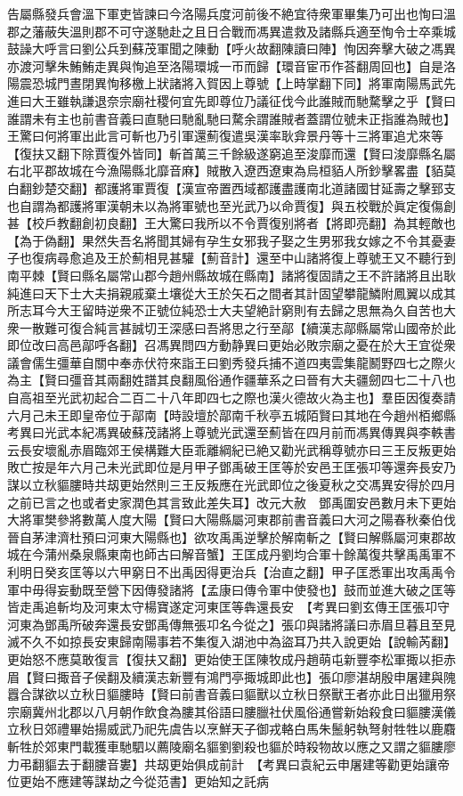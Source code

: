 告屬縣發兵會溫下軍吏皆諫曰今洛陽兵度河前後不絶宜待衆軍畢集乃可出也恂曰溫郡之藩蔽失溫則郡不可守遂馳赴之且日合戰而馮異遣救及諸縣兵適至恂令士卒乘城鼓譟大呼言曰劉公兵到蘇茂軍聞之陳動【呼火故翻陳讀曰陣】恂因奔擊大破之馮異亦渡河擊朱鮪鮪走異與恂追至洛陽環城一帀而歸【環音宦帀作荅翻周回也】自是洛陽震恐城門晝閉異恂移檄上狀諸將入賀因上尊號【上時掌翻下同】將軍南陽馬武先進曰大王雖執謙退奈宗廟社稷何宜先即尊位乃議征伐今此誰賊而馳騖擊之乎【賢曰誰謂未有主也前書音義曰直馳曰馳亂馳曰騖余謂誰賊者蓋謂位號未正指誰為賊也】王驚曰何將軍出此言可斬也乃引軍還薊復遣吳漢率耿弇景丹等十三將軍追尤來等【復扶又翻下除賈復外皆同】斬首萬三千餘級遂窮追至浚靡而還【賢曰浚靡縣名屬右北平郡故城在今漁陽縣北靡音麻】賊散入遼西遼東為烏桓貊人所鈔擊畧盡【貊莫白翻鈔楚交翻】都護將軍賈復【漢宣帝置西域都護盡護南北道諸國甘延壽之擊郅支也自謂為都護將軍漢朝未以為將軍號也至光武乃以命賈復】與五校戰於眞定復傷創甚【校戶教翻創初良翻】王大驚曰我所以不令賈復别將者【將即亮翻】為其輕敵也【為于偽翻】果然失吾名將聞其婦有孕生女邪我子娶之生男邪我女嫁之不令其憂妻子也復病尋愈追及王於薊相見甚驩【薊音計】還至中山諸將復上尊號王又不聽行到南平棘【賢曰縣名屬常山郡今趙州縣故城在縣南】諸將復固請之王不許諸將且出耿純進曰天下士大夫捐親戚棄土壤從大王於矢石之間者其計固望攀龍鱗附鳳翼以成其所志耳今大王留時逆衆不正號位純恐士大夫望絶計窮則有去歸之思無為久自苦也大衆一散難可復合純言甚誠切王深感曰吾將思之行至鄗【續漢志鄗縣屬常山國帝於此即位改曰高邑鄗呼各翻】召馮異問四方動静異曰更始必敗宗廟之憂在於大王宜從衆議會儒生彊華自關中奉赤伏符來詣王曰劉秀發兵捕不道四夷雲集龍鬭野四七之際火為主【賢曰彊音其兩翻姓譜其良翻風俗通作疆華系之曰晉有大夫疆劒四七二十八也自高祖至光武初起合二百二十八年即四七之際也漢火德故火為主也】羣臣因復奏請六月己未王即皇帝位于鄗南【時設壇於鄗南千秋亭五城陌賢曰其地在今趙州栢鄉縣　考異曰光武本紀馮異破蘇茂諸將上尊號光武還至薊皆在四月前而馮異傳異與李軼書云長安壞亂赤眉臨郊王侯構難大臣乖離綱紀已絶又勸光武稱尊號亦曰三王反叛更始敗亡按是年六月己未光武即位是月甲子鄧禹破王匡等於安邑王匡張卭等還奔長安乃謀以立秋貙膢時共刼更始然則三王反叛應在光武即位之後夏秋之交馮異安得於四月之前已言之也或者史家潤色其言致此差失耳】改元大赦　鄧禹圍安邑數月未下更始大將軍樊參將數萬人度大陽【賢曰大陽縣屬河東郡前書音義曰大河之陽春秋秦伯伐晉自茅津濟杜預曰河東大陽縣也】欲攻禹禹逆擊於解南斬之【賢曰解縣屬河東郡故城在今蒲州桑泉縣東南也師古曰解音蟹】王匡成丹劉均合軍十餘萬復共擊禹禹軍不利明日癸亥匡等以六甲窮日不出禹因得更治兵【治直之翻】甲子匡悉軍出攻禹禹令軍中毋得妄動既至營下因傳發諸將【孟康曰傳令軍中使發也】鼓而並進大破之匡等皆走禹追斬均及河東太守楊寶遂定河東匡等犇還長安　【考異曰劉玄傳王匡張卭守河東為鄧禹所破奔還長安鄧禹傳無張卭名今從之】張卬與諸將議曰赤眉旦暮且至見滅不久不如掠長安東歸南陽事若不集復入湖池中為盜耳乃共入說更始【說輸芮翻】更始怒不應莫敢復言【復扶又翻】更始使王匡陳牧成丹趙萌屯新豐李松軍掫以拒赤眉【賢曰掫音子侯翻及續漢志新豐有鴻門亭掫城即此也】張卬廖湛胡殷申屠建與隗囂合謀欲以立秋日貙膢時【賢曰前書音義曰貙獸以立秋日祭獸王者亦此日出獵用祭宗廟冀州北郡以八月朝作飲食為膢其俗語曰膢臘社伏風俗通嘗新始殺食曰貙膢漢儀立秋日郊禮畢始揚威武乃祀先虞告以烹鮮天子御戎輅白馬朱鬛躬執弩射牲牲以鹿麛斬牲於郊東門載獲車馳駟以薦陵廟名貙劉劉殺也貙於時殺物故以應之又謂之貙膢廖力弔翻貙去于翻膢音婁】共刼更始俱成前計　【考異曰袁紀云申屠建等勸更始讓帝位更始不應建等謀劫之今從范書】更始知之託病